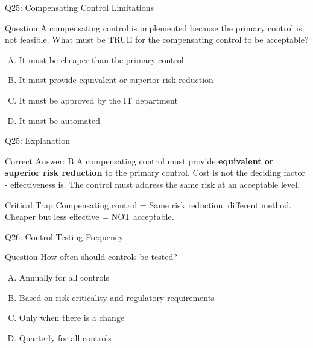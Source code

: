 \documentclass{beamer}
\begin{document}
	\begin{frame}{Q25: Compensating Control Limitations}
		\begin{block}{Question}
			A compensating control is implemented because the primary control is not feasible. What must be TRUE for the compensating control to be acceptable?
		\end{block}
		\begin{enumerate}[(A)]
			\item It must be cheaper than the primary control
			\item It must provide equivalent or superior risk reduction
			\item It must be approved by the IT department
			\item It must be automated
		\end{enumerate}
	\end{frame}
	
	\begin{frame}{Q25: Explanation}
		\begin{block}{Correct Answer: B}
			A compensating control must provide \textbf{equivalent or superior risk reduction} to the primary control. Cost is not the deciding factor - effectiveness is. The control must address the same risk at an acceptable level.
		\end{block}
		\begin{alertblock}{Critical Trap}
			Compensating control = Same risk reduction, different method.
			Cheaper but less effective = NOT acceptable.
		\end{alertblock}
	\end{frame}
	
	\begin{frame}{Q26: Control Testing Frequency}
		\begin{block}{Question}
			How often should controls be tested?
		\end{block}
		\begin{enumerate}[(A)]
			\item Annually for all controls
			\item Based on risk criticality and regulatory requirements
			\item Only when there is a change
			\item Quarterly for all controls
		\end{enumerate}
	\end{frame}
	
\end{document}
